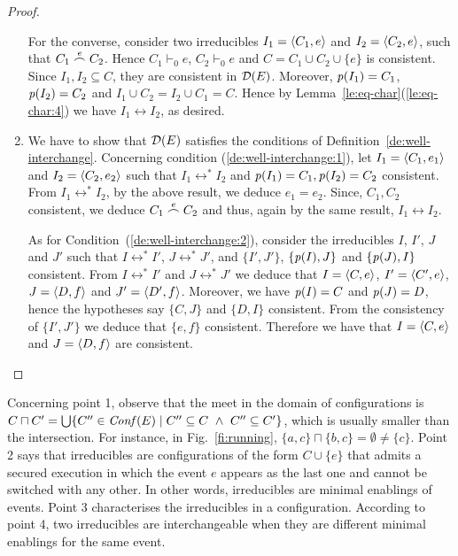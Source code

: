 \begin{proof}
\begin{enumerate}
  For the converse, consider two irreducibles $I_1 = \langle{C_1}, {e}\rangle$
  and $I_2 = \langle{C_2}, {e}\rangle$, such that $C_1 \stackrel{e}{\frown} C_2$. Hence
  $C_1 \vdash_0 e$, $C_2 \vdash_0 e$ and
  $C = C_1 \cup C_2 \cup \{ e \}$ is consistent. Since
  $I_1, I_2 \subseteq C$, they are consistent in
  $\mathcal{D}({{E}})$. Moreover, $\mathit{p}({I_1}) = C_1$, $\mathit{p}({I_2}) = C_2$
  and $I_1 \cup C_2 = I_2 \cup C_1 = C$.
  Hence by
  Lemma~\ref{le:eq-char}(\ref{le:eq-char:4}) we have
  $I_1 \leftrightarrow I_2$, as desired.

  
\item 
  We have to show that $\mathcal{D}({E})$ satisfies the conditions of Definition~\ref{de:well-interchange}. Concerning condition (\ref{de:well-interchange:1}), let
  $I_1 = \langle{C_1}, {e_1}\rangle$ and $I_2 = \langle{C_2}, {e_2}\rangle$ such that
  $I_1 \leftrightarrow^* I_2$ and $\mathit{p}({I_1})=C_1, \mathit{p}({I_2})=C_2$ consistent. From
  $I_1 \leftrightarrow^* I_2$, by the above result, we deduce $e_1 = e_2$.
  Since, $C_1, C_2$ consistent, we deduce $C_1 \stackrel{e}{\frown} C_2$ and thus,
  again by the same result, $I_1 \leftrightarrow I_2$.

  As for Condition~(\ref{de:well-interchange:2}), consider the
  irreducibles $I$, $I'$, $J$ and $J'$ such that
  $I \leftrightarrow^* I'$, $J \leftrightarrow^* J'$, and
  $\{I', J'\}$, $\{\mathit{p}({I}), J\}$ and $\{\mathit{p}({J}), I\}$
  consistent. From $I \leftrightarrow^* I'$ and
  $J \leftrightarrow^* J'$ we deduce that $I = \langle{C}, {e}\rangle$,
  $I' = \langle{C'}, {e}\rangle$, $J = \langle{D}, {f}\rangle$ and $J' =
  \langle{D'}, {f}\rangle$. Moreover, we have $\mathit{p}({I})=C$ and $\mathit{p}({J})=D$,
  hence the hypotheses say $\{C, J\}$ and $\{D, I\}$ consistent. From
  the consistency of $\{I', J'\}$ we deduce that $\{e,f\}$
  consistent. Therefore we have that $I = \langle{C}, {e}\rangle$ and
  $J = \langle{D}, {f}\rangle$ are consistent.
\end{enumerate}
\end{proof}


Concerning point 1, observe that the meet in the domain of
configurations is
$C \sqcap C' = \bigcup \{ C'' \in \mathit{Conf}({{E}}) \mid C'' \subseteq C\
\land\ C'' \subseteq C'\}$, which is usually smaller than the
intersection. For instance, in Fig.~\ref{fi:running},
$\{a,c\} \sqcap \{b, c\} = \emptyset \neq \{c\}$.
%
Point 2 says that irreducibles are configurations of the form
$C \cup \{ e \}$ that admits a secured execution in which the event
$e$ appears as the last one and cannot be switched with any other. In
other words, irreducibles are minimal enablings of events.
%
Point 3 characterises the irreducibles in a configuration.  According
to point 4, two irreducibles are interchangeable when they are
different minimal enablings for the same event.


